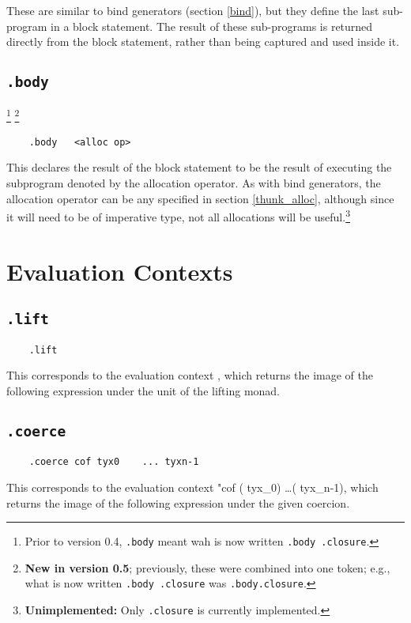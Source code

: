 \documentclass{report}
\newcommand\stringcode[1]{\texttt{#1}}
\newcommand\unimpl[1]{\footnote{\textbf{Unimplemented: }#1}}
\newcommand\old[2]{\footnote{Prior to version #1, #2}}
\newcommand\new[2]{\footnote{\textbf{New in version #1}; previously, #2}}
\begin{document}
These are similar to bind generators (section \ref{bind}), but they define the last sub-program in a block statement.
The result of these sub-programs is returned directly from the block statement, rather than being captured and used inside it.

\subsection{\stringcode{.body}}
\old{0.4}{\stringcode{.body} meant wah is now written \stringcode{.body	.closure}.}
\new{0.5}{these were combined into one token; e.g., what is now written \stringcode{.body	.closure} was \stringcode{.body.closure}.}

\begin{verbatim}
	.body	<alloc op>
\end{verbatim}

This declares the result of the block statement to be the result of executing the subprogram denoted by the allocation operator.
As with bind generators, the allocation operator can be any specified in section \ref{thunk_alloc},
although since it will need to be of imperative type, not all allocations will be useful.\unimpl{Only \stringcode{.closure} is currently implemented.}

\section{Evaluation Contexts}
\label{cont_push}

\subsection{\stringcode{.lift}}

\begin{verbatim}
	.lift
\end{verbatim}

This corresponds to the evaluation context \<\lfloor\bullet\rfloor\>, which returns the image of the following expression under the unit of the lifting monad.

\subsection{\stringcode{.coerce}}

\begin{verbatim}
	.coerce	cof	tyx0	...	tyxn-1
\end{verbatim}
This corresponds to the evaluation context \<\bullet\;"\!\rhd\;cof ( tyx_0) \ldots ( tyx_{n-1})\>,
which returns the image of the following expression under the given coercion.
\end{document}

